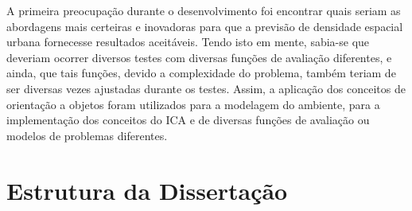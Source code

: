 A primeira preocupação durante o desenvolvimento foi encontrar quais seriam as abordagens mais certeiras e inovadoras para que a previsão de densidade espacial urbana fornecesse resultados aceitáveis. Tendo isto em mente, sabia-se que deveriam ocorrer diversos testes com diversas funções de avaliação diferentes, e ainda, que tais funções, devido a complexidade do problema, também teriam de ser diversas vezes ajustadas durante os testes. Assim, a aplicação dos conceitos de orientação a objetos foram utilizados para a modelagem do ambiente, para a implementação dos conceitos do ICA e de diversas funções de avaliação ou modelos de problemas diferentes.





\section{Estrutura da Dissertação}

